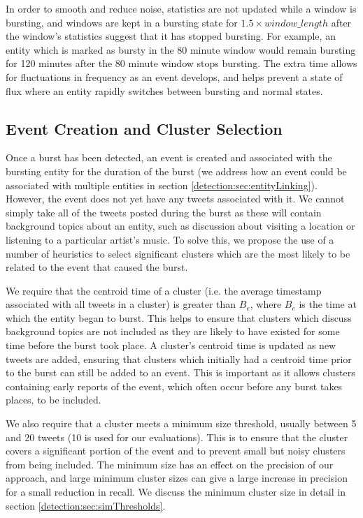In order to smooth and reduce noise, statistics are not updated while a window is bursting, and windows are kept in a bursting state for \(1.5 \times window\_length\) after the window's statistics suggest that it has stopped bursting. For example, an entity which is marked as bursty in the 80 minute window would remain bursting for 120 minutes after the 80 minute window stops bursting.  The extra time allows for fluctuations in frequency as an event develops, and helps prevent a state of flux where an entity rapidly switches between bursting and normal states.

\subsection{Event Creation and Cluster Selection}
\label{detection:sec:eventCreation}
Once a burst has been detected, an event is created and associated with the bursting entity for the duration of the burst (we address how an event could be associated with multiple entities in section \ref{detection:sec:entityLinking}).
However, the event does not yet have any tweets associated with it.
We cannot simply take all of the tweets posted during the burst as these will contain background topics about an entity, such as discussion about visiting a location or listening to a particular artist's music. To solve this, we propose the use of a number of heuristics to select significant clusters which are the most likely to be related to the event that caused the burst.

We require that the centroid time of a cluster (i.e. the average timestamp associated with all tweets in a cluster) is greater than \(B_e\), where \(B_e\) is the time at which the entity began to burst. This helps to ensure that clusters which discuss background topics are not included as they are likely to have existed for some time before the burst took place. A cluster's centroid time is updated as new tweets are added, ensuring that clusters which initially had a centroid time prior to the burst can still be added to an event. This is important as it allows clusters containing early reports of the event, which often occur before any burst takes places, to be included.

We also require that a cluster meets a minimum size threshold, usually between 5 and 20 tweets (10 is used for our evaluations).
This is to ensure that the cluster covers a significant portion of the event and to prevent small but noisy clusters from being included. The minimum size has an effect on the precision of our approach, and large minimum cluster sizes can give a large increase in precision for a small reduction in recall. We discuss the minimum cluster size in detail in section \ref{detection:sec:simThresholds}.

